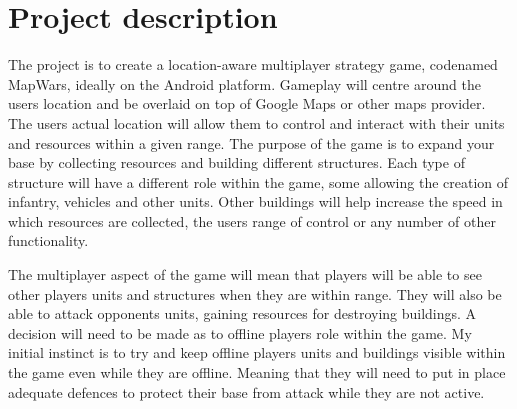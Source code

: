 \documentclass[11pt,fleqn,twoside]{article}
\begin{document}

\mmp

\setcounter{tocdepth}{3} %


\section{Project description}
The project is to create a location-aware multiplayer strategy game, codenamed MapWars, ideally on the Android platform. Gameplay will centre around the users location and be overlaid on top of Google Maps or other maps provider. The users actual location will allow them to control and interact with their units and resources within a given range. The purpose of the game is to expand your base by collecting resources and building different structures. Each type of structure will have a different role within the game, some allowing the creation of infantry, vehicles and other units. Other buildings will help increase the speed in which resources are collected, the users range of control or any number of other functionality.

The multiplayer aspect of the game will mean that players will be able to see other players units and structures when they are within range. They will also be able to attack opponents units, gaining resources for destroying buildings. A decision will need to be made as to offline players role within the game. My initial instinct is to try and keep offline players units and buildings visible within the game even while they are offline. Meaning that they will need to put in place adequate defences to protect their base from attack while they are not active.
\end{document}
